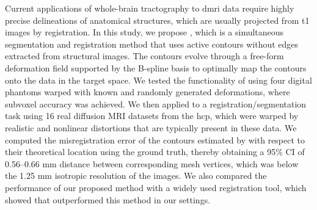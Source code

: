 Current applications of whole-brain tractography to \acrlong*{dmri} data require highly precise
  delineations of anatomical structures, which are usually projected from \acrlong*{t1} images
  by registration.
In this study, we propose \regseg{}, which is a simultaneous segmentation and registration method
  that uses active contours without edges extracted from structural images.
The contours evolve through a free-form deformation field supported by the B-spline basis
  to optimally map the contours onto the data in the target space.
We tested the functionality of \regseg{} using four digital phantoms warped with known and
  randomly generated deformations, where subvoxel accuracy was achieved.
We then applied \regseg{} to a registration/segmentation task using 16 real diffusion MRI
  datasets from the \acrlong*{hcp}, which were warped by realistic and nonlinear distortions that are typically
  present in these data.
We computed the misregistration error of the contours estimated by \regseg{} with respect
  to their theoretical location using the ground truth, thereby obtaining a 95\% CI of 0.56--0.66 mm
  distance between corresponding mesh vertices, which was below the 1.25 mm isotropic resolution of the images.
We also compared the performance of our proposed method with a widely used registration tool, which showed
  that \regseg{} outperformed this method in our settings.